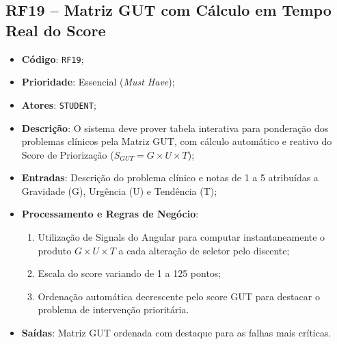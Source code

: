 \subsection{RF19 -- Matriz GUT com Cálculo em Tempo Real do Score}
\begin{itemize}
    \item \textbf{Código}: \texttt{RF19};
    \item \textbf{Prioridade}: Essencial (\textit{Must Have});
    \item \textbf{Atores}: \texttt{STUDENT};
    \item \textbf{Descrição}: O sistema deve prover tabela interativa para ponderação dos problemas clínicos pela Matriz GUT, com cálculo automático e reativo do Score de Priorização ($S_{GUT} = G \times U \times T$);
    \item \textbf{Entradas}: Descrição do problema clínico e notas de 1 a 5 atribuídas a Gravidade (G), Urgência (U) e Tendência (T);
    \item \textbf{Processamento e Regras de Negócio}:
    \begin{enumerate}
        \item Utilização de Signals do Angular para computar instantaneamente o produto $G \times U \times T$ a cada alteração de seletor pelo discente;
        \item Escala do score variando de 1 a 125 pontos;
        \item Ordenação automática decrescente pelo score GUT para destacar o problema de intervenção prioritária.
    \end{enumerate}
    \item \textbf{Saídas}: Matriz GUT ordenada com destaque para as falhas mais críticas.
\end{itemize}

